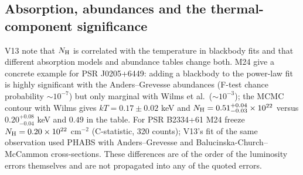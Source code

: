 \documentclass[11pt,a4paper]{article}
\begin{document}
\subsection{Absorption, abundances and the thermal-component significance}
V13 note that $N_{\rm H}$ is correlated with the temperature in blackbody fits and that different absorption models and abundance tables change both. M24 give a concrete example for PSR J0205+6449: adding a blackbody to the power-law fit is highly significant with the Anders--Grevesse abundances (F-test chance probability $\sim10^{-7}$) but only marginal with Wilms et al.\ ($\sim10^{-3}$); the MCMC contour with Wilms gives $kT=0.17\pm0.02$ keV and $N_{\rm H}=0.51^{+0.04}_{-0.03}\times10^{22}$ versus $0.20^{+0.08}_{-0.04}$ keV and $0.49$ in the table. For PSR B2334+61 M24 freeze $N_{\rm H}=0.20\times10^{22}$ cm$^{-2}$ (C-statistic, 320 counts); V13's fit of the same observation used PHABS with Anders--Grevesse and Balucinska-Church--McCammon cross-sections. These differences are of the order of the luminosity errors themselves and are not propagated into any of the quoted errors.
\end{document}

